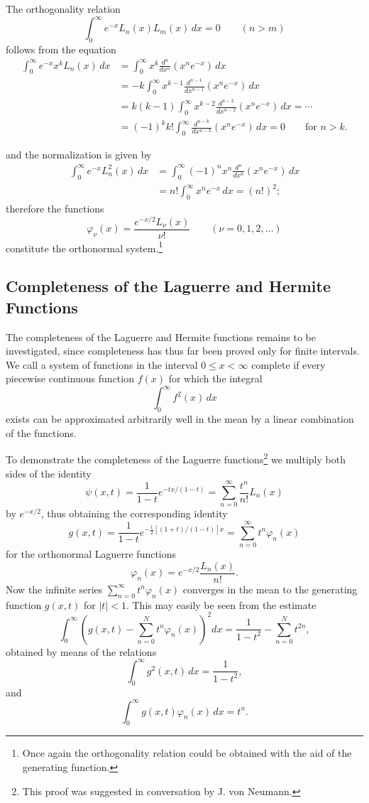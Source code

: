 The orthogonality relation
\[
\int_0^{\infty}e^{-x}L_n(x)L_m(x)\,dx=0\qquad(n>m)
\]
follows from the equation
\[
\begin{aligned}
\int_0^{\infty}e^{-x}x^kL_n(x)\,dx
&=\int_0^{\infty}x^k\frac{d^n}{dx^n}(x^ne^{-x})\,dx\\
&=-k\int_0^{\infty}x^{k-1}\frac{d^{n-1}}{dx^{n-1}}(x^ne^{-x})\,dx\\
&=k(k-1)\int_0^{\infty}x^{k-2}\frac{d^{n-2}}{dx^{n-2}}(x^ne^{-x})\,dx=\cdots\\
&=(-1)^kk!\int_0^{\infty}\frac{d^{n-k}}{dx^{n-k}}(x^ne^{-x})\,dx=0\qquad\text{for }n>k.
\end{aligned}
\]

and the normalization is given by
\[
\begin{aligned}
\int_0^\infty e^{-x}L_n^2(x)\,dx
&=\int_0^\infty (-1)^n x^n\frac{d^n}{dx^n}(x^ne^{-x})\,dx\\
&=n!\int_0^\infty x^ne^{-x}\,dx=(n!)^2;
\end{aligned}
\]
therefore the functions
\[
\varphi_\nu(x)=\frac{e^{-x/2}L_\nu(x)}{\nu!}
\qquad(\nu=0,1,2,\ldots)
\]
constitute the orthonormal system.\footnote{Once again the orthogonality relation could be obtained with the aid of the generating function.}

\subsection{Completeness of the Laguerre and Hermite Functions}
The completeness of the Laguerre and Hermite functions remains to be investigated, since completeness has thus far been proved only for finite intervals. We call a system of functions in the interval $0\le x<\infty$ complete if every piecewise continuous function $f(x)$ for which the integral
\[
\int_0^\infty f^2(x)\,dx
\]
exists can be approximated arbitrarily well in the mean by a linear combination of the functions.

To demonstrate the completeness of the Laguerre functions\footnote{This proof was suggested in conversation by J. von Neumann.} we multiply both sides of the identity
\[
\psi(x,t)=\frac{1}{1-t}e^{-tx/(1-t)}
=\sum_{n=0}^{\infty}\frac{t^n}{n!}L_n(x)
\]
by $e^{-x/2}$, thus obtaining the corresponding identity
\[
g(x,t)=\frac{1}{1-t}e^{-\frac12[(1+t)/(1-t)]x}
=\sum_{n=0}^{\infty}t^n\varphi_n(x)
\]
for the orthonormal Laguerre functions
\[
\varphi_n(x)=e^{-x/2}\frac{L_n(x)}{n!}.
\]
Now the infinite series $\sum_{n=0}^{\infty}t^n\varphi_n(x)$ converges in the mean to the generating function $g(x,t)$ for $|t|<1$. This may easily be seen from the estimate
\[
\int_0^\infty\left(g(x,t)-\sum_{n=0}^{N}t^n\varphi_n(x)\right)^2dx
=\frac{1}{1-t^2}-\sum_{n=0}^{N}t^{2n},
\]
obtained by means of the relations
\[
\int_0^\infty g^2(x,t)\,dx=\frac{1}{1-t^2},
\]
and
\[
\int_0^\infty g(x,t)\varphi_n(x)\,dx=t^n.
\]


